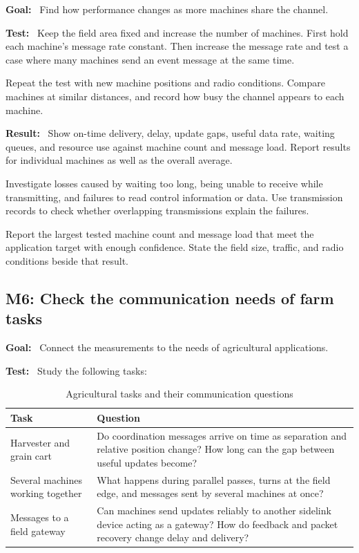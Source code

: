 \documentclass[11pt,a4paper]{article}
\newcommand{\field}[1]{\textbf{#1:}~}
\begin{document}
\field{Goal} Find how performance changes as more machines share the channel.

\field{Test} Keep the field area fixed and increase the number of machines.
First hold each machine's message rate constant. Then increase the message
rate and test a case where many machines send an event message at the same
time.

Repeat the test with new machine positions and radio conditions. Compare
machines at similar distances, and record how busy the channel appears to
each machine.

\field{Result} Show on-time delivery, delay, update gaps, useful data rate,
waiting queues, and resource use against machine count and message load.
Report results for individual machines as well as the overall average.

Investigate losses caused by waiting too long, being unable to receive while
transmitting, and failures to read control information or data. Use transmission
records to check whether overlapping transmissions explain the failures.

Report the largest tested machine count and message load that meet the
application target with enough confidence. State the field size, traffic,
and radio conditions beside that result.

\subsection{M6: Check the communication needs of farm tasks}

\field{Goal} Connect the measurements to the needs of agricultural applications.

\field{Test} Study the following tasks:
\begin{table}[htbp]
\centering
\caption{Agricultural tasks and their communication questions}
\small
\begin{tabularx}{\textwidth}{YY}
\toprule
\textbf{Task} & \textbf{Question} \\
\midrule
Harvester and grain cart &
Do coordination messages arrive on time as separation and relative position
change? How long can the gap between useful updates become? \\
Several machines working together &
What happens during parallel passes, turns at the field edge, and messages
sent by several machines at once? \\
Messages to a field gateway &
Can machines send updates reliably to another sidelink device acting as a
gateway? How do feedback and packet recovery change delay and delivery? \\
\bottomrule
\end{tabularx}
\end{table}
\end{document}
